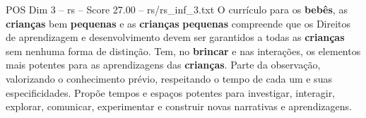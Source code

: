 \begin{textsample}{POS Dim 3 – rs – Score 27.00 – rs/rs\_inf\_3.txt}
O currículo para os \textbf{bebês}, as \textbf{crianças} bem \textbf{pequenas} e as \textbf{crianças} \textbf{pequenas} compreende que os Direitos de aprendizagem e desenvolvimento devem ser garantidos a todas as \textbf{crianças} sem nenhuma forma de distinção.
Tem, no \textbf{brincar} e nas interações, os elementos mais potentes para as aprendizagens das \textbf{crianças}.
Parte da observação, valorizando o conhecimento prévio, respeitando o tempo de cada um e suas especificidades.
Propõe tempos e espaços potentes para investigar, interagir, explorar, comunicar, experimentar e construir novas narrativas e aprendizagens.

\end{textsample}
